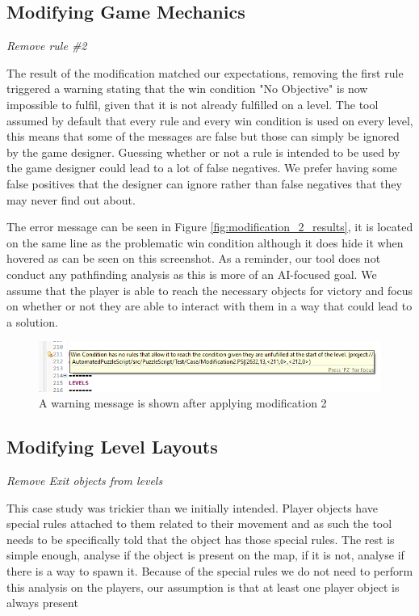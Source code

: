 \subsection{Modifying Game Mechanics}
\textit{Remove rule \#2}

The result of the modification matched our expectations, removing the first rule triggered a warning stating that the win condition "No Objective" is now impossible to fulfil, given that it is not already fulfilled on a level. The tool assumed by default that every rule and every win condition is used on every level, this means that some of the messages are false but those can simply be ignored by the game designer. Guessing whether or not a rule is intended to be used by the game designer could lead to a lot of false negatives. We prefer having some false positives that the designer can ignore rather than false negatives that they may never find out about.

The error message can be seen in Figure \ref{fig:modification_2_results}, it is located on the same line as the problematic win condition although it does hide it when hovered as can be seen on this screenshot. As a reminder, our tool does not conduct any pathfinding analysis as this is more of an AI-focused goal. We assume that the player is able to reach the necessary objects for victory and focus on whether or not they are able to interact with them in a way that could lead to a solution. 

\begin{figure}[!t]
    \centering
    \includegraphics[width=1\textwidth]{images/case_results/Modification_2_Results.png}
    \caption{A warning message is shown after applying modification 2}
    \label{fig:modification_2_results_old}
\end{figure}

\subsection{Modifying Level Layouts}
\textit{Remove Exit objects from levels}

This case study was trickier than we initially intended. Player objects have special rules attached to them related to their movement and as such the tool needs to be specifically told that the object has those special rules. The rest is simple enough, analyse if the object is present on the map, if it is not, analyse if there is a way to spawn it. Because of the special rules we do not need to perform this analysis on the players, our assumption is that at least one player object is always present 

